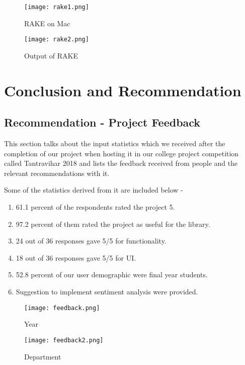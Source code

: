 \documentclass[a4paper,12pt]{report}
\begin{document}
\FloatBarrier
\begin{figure}[h!]
  \centering
  \texttt{[image: rake1.png]}
  \caption{RAKE on Mac }
\end{figure}

\FloatBarrier
\begin{figure}[h!]
  \centering
  \texttt{[image: rake2.png]}
  \caption{Output of RAKE}
\end{figure}



\chapter{Conclusion and Recommendation}
\section{Recommendation - Project Feedback}
\par This section talks about the input statistics which we received after the completion of our project when hosting it in our college project competition called Tantravihar 2018 and lists the feedback received from people and the relevant recommendations with it.\\

\par Some of the statistics derived from it are included below -
\begin{enumerate}
  \item 61.1 percent of the respondents rated the project 5.
  \item 97.2 percent of them rated the project as useful for the library.
  \item 24 out of 36 responses gave 5/5 for functionality.
  \item 18 out of 36 responses gave 5/5 for UI.
  \item 52.8 percent of our user demographic were final year students.
  \item Suggestion to implement sentiment analysis were provided.
\end{enumerate}

\FloatBarrier
\begin{figure}[h!]
  \centering
  \texttt{[image: feedback.png]}
  \caption{Year}
\end{figure}

\FloatBarrier
\begin{figure}[h!]
  \centering
  \texttt{[image: feedback2.png]}
  \caption{Department}
\end{figure}
\end{document}
